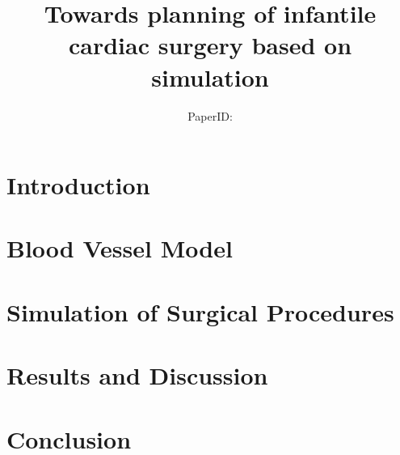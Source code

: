 \documentclass[runningheads,a4paper]{llncs}
\begin{document}
\mainmatter            %

\title{Towards planning of infantile cardiac surgery based on simulation}

\author{PaperID:} %

\maketitle

\begin{abstract}
\end{abstract}

\section{Introduction}
 

\section{Blood Vessel Model}


\section{Simulation of Surgical Procedures}
\label{sec-method}


\section{Results and Discussion}


\section{Conclusion}

\end{document}
